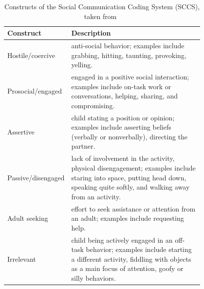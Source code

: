 \documentclass{article}
\begin{document}
\begin{table}[]
\centering
\caption{Constructs of the Social Communication Coding System (SCCS), taken from~\cite{olswang2006reliability}}
\label{table|sccs}
\renewcommand{\arraystretch}{1.8}
\begin{tabular}{@{}lp{0.8\linewidth}@{}}
\toprule
\bf Construct          & \bf Description                                                                                                                                                                                                                                                                                                                                           \\ \midrule
Hostile/coercive   & anti-social behavior; examples include grabbing, hitting, taunting, provoking, yelling.                                                       \\
Prosocial/engaged  & engaged in a positive social interaction; examples include on-task work or conversations, helping, sharing, and compromising.                 \\
Assertive          & child stating a position or opinion; examples include asserting beliefs (verbally or nonverbally), directing the partner.                     \\
Passive/disengaged & lack of involvement in the activity, physical disengagement; examples include staring into space, putting head down, speaking quite softly, and walking away from an activity.\\
Adult seeking      & effort to seek assistance or attention from an adult; examples include requesting help.                                                       \\
Irrelevant         & child being actively engaged in an off-task behavior; examples include starting a different activity, fiddling with objects as a main focus of attention, goofy or silly behaviors. \\ \bottomrule
\end{tabular}
\end{table}
\end{document}
